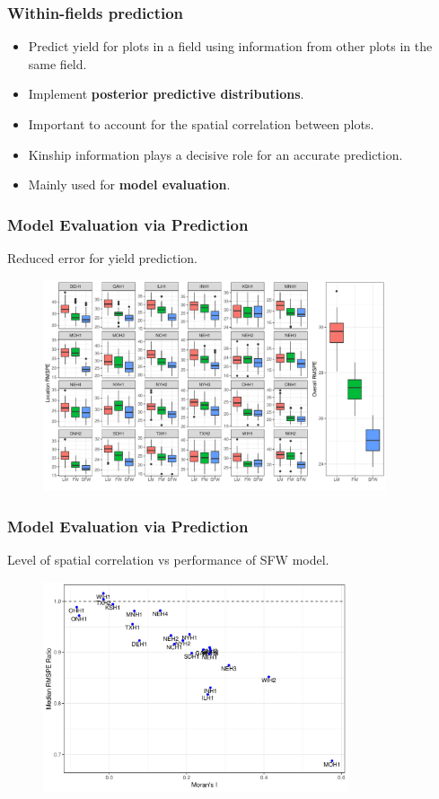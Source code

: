 \documentclass{beamer}
\begin{document}
\begin{frame}
	\frametitle{Within-fields prediction}
	
	\begin{itemize}
	\item Predict yield for plots in a field using information from other plots in the same field.
	\item Implement \textbf{posterior predictive distributions}.
	\item Important to account for the spatial correlation between plots.
	\item Kinship information plays a decisive role for an accurate prediction.
	\item Mainly used for \textbf{model evaluation}.
	\end{itemize}
	
\end{frame}



\begin{frame}
	\frametitle{Model Evaluation via Prediction}
	Reduced error for yield prediction.
	\begin{figure}[H]
		\centering
		\includegraphics[width = 0.9\textwidth]{com_pred3.pdf}
	\end{figure}
\end{frame}



\begin{frame}
	\frametitle{Model Evaluation via Prediction}
Level of spatial correlation vs performance of SFW model.

	\begin{figure}[H]
		\centering
		\includegraphics[width = 0.8\textwidth]{morans_i.pdf}
	\end{figure}
\end{frame}
\end{document}
